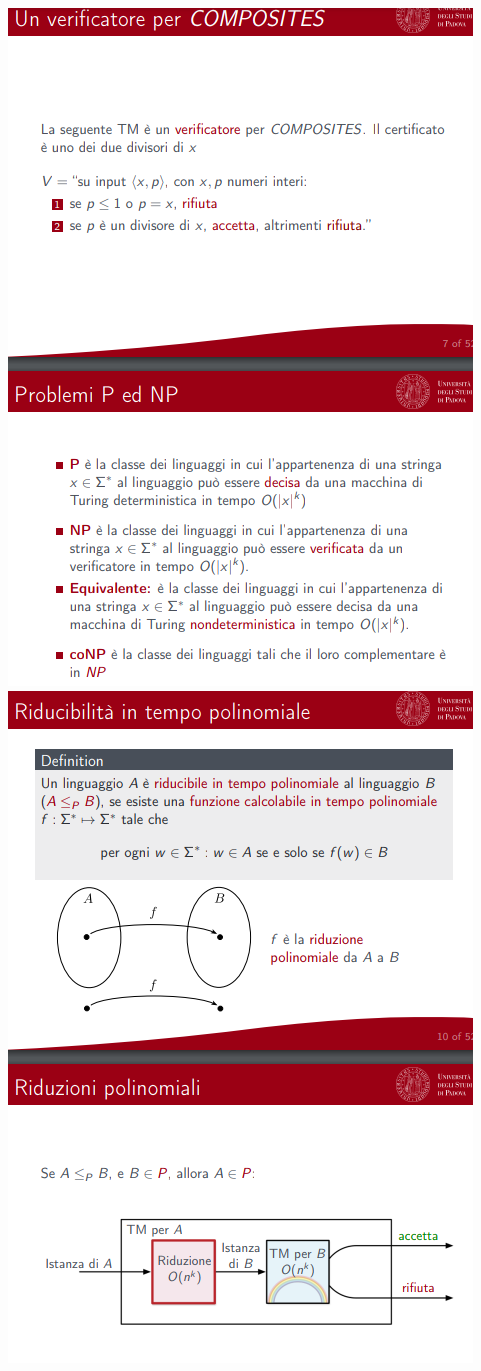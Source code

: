 \documentclass[]{article}
\begin{document}
\begin{center}
				\includegraphics[scale=0.8]{NP3.png}
				\includegraphics[scale=0.8]{NP4.png}

\end{center}
\end{document}
